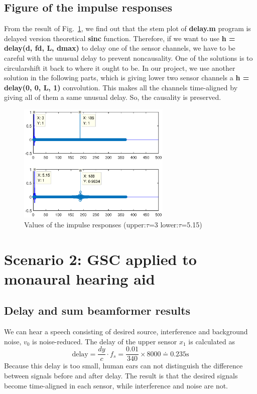 \documentclass[onecolumn, conference]{IEEEtran}
\begin{document}
\subsection{Figure of the impulse responses}

From the result of Fig.~\ref{Values of the impulse responses}, we find out that the stem plot of \textbf{delay.m} program is delayed version theoretical \textbf{sinc} function. Therefore, if we want to use \textbf{h = delay(d, fd, L, dmax)} to delay one of the sensor channels, we have to be careful with the unusual delay to prevent noncausality. One of the solutions is to circularshift it back to where it ought to be. In our project, we use another solution in the following parts, which is giving lower two sensor channels a \textbf{h = delay(0, 0, L, 1)} convolution. This makes all the channels time-aligned by giving all of them a same unusual delay. So, the causality is preserved.

\begin{figure}[htbp]
	\centerline{\includegraphics[width=0.65\textwidth]{img/2_b_3.eps}}
	\caption{Values of the impulse responses (upper:\(\tau \)=3 lower:\(\tau \)=5.15)}
	\label{Values of the impulse responses}
\end{figure}

\section{Scenario 2: GSC applied to monaural hearing aid}\label{monaural}

\subsection{Delay and sum beamformer results}

We can hear a speech consisting of desired source, interference and background noise, $v_0$ is noise-reduced. The delay of the upper sensor $x_1$ is calculated as 
\begin{equation*}
	\text{delay} = \frac{dy}{c}\cdot f_s =\frac{0.01}{340} \times 8000 \doteq 0.235 \text{s}
\end{equation*}
Because this delay is too small, human ears can not distinguish the difference between signals before and after delay. The result is that the desired signals become time-aligned in each sensor, while interference and noise are not. 
\end{document}
